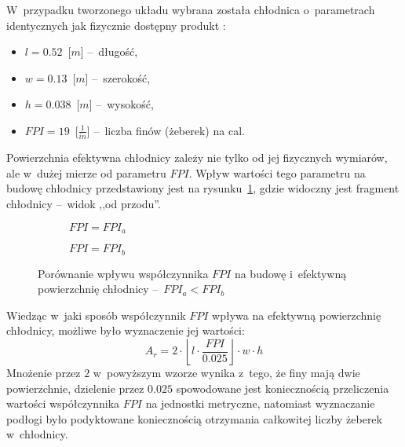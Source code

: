 W~przypadku tworzonego układu wybrana została chłodnica o~parametrach
identycznych jak fizycznie dostępny produkt \cite{EKWBradiator}:
\begin{itemize}
    \item $l = 0.52$~[$m$] --~długość,
    \item $w = 0.13$~[$m$] --~szerokość,
    \item $h = 0.038$~[$m$] --~wysokość,
    \item $FPI = 19$~[$\frac{1}{in}$] --~liczba finów (żeberek) na cal.
\end{itemize}
Powierzchnia efektywna chłodnicy zależy nie tylko od jej fizycznych wymiarów,
ale w~dużej mierze od parametru $FPI$. Wpływ wartości tego parametru na budowę
chłodnicy przedstawiony jest na rysunku~\ref{fig:fpicomp}, gdzie widoczny jest
fragment chłodnicy --~widok ,,od przodu''.
\begin{figure}[ht]
    \centering
    \begin{subfigure}{.45\textwidth}
        \centering
        \caption{$FPI = FPI_a$}
    \end{subfigure}
    \begin{subfigure}{.45\textwidth}
        \centering
        \caption{$FPI = FPI_b$}
    \end{subfigure}
    \caption{Porównanie wpływu współczynnika $FPI$ na budowę i~efektywną
    powierzchnię chłodnicy --~$FPI_a < FPI_b$}
    \label{fig:fpicomp}
\end{figure}

Wiedząc w~jaki sposób współczynnik $FPI$ wpływa na efektywną powierzchnię
chłodnicy, możliwe było wyznaczenie jej wartości:
\begin{equation}
    A_r = 2 \cdot \left\lfloor l \cdot \frac{FPI}{0.025} \right\rfloor \cdot w
    \cdot h
    \label{equ:radA}
\end{equation}
Mnożenie przez $2$ w~powyższym wzorze wynika z~tego, że finy mają dwie
powierzchnie, dzielenie przez $0.025$ spowodowane jest koniecznością
przeliczenia wartości współczynnika $FPI$ na jednostki metryczne, natomiast
wyznaczanie podłogi było podyktowane koniecznością otrzymania całkowitej liczby
żeberek w~chłodnicy.

